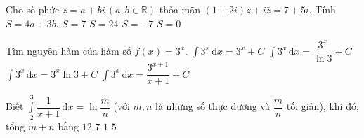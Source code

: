 \begin{ex}%
Cho số phức $z=a+bi\, (a,b\in \mathbb{R})$ thỏa mãn $(1+2i)z+i\bar{z}=7+5i$. Tính $S=4a+3b$.
\choice 
{$S=7$}
{$S=24$}
{$S=-7$}
{\True $S=0$}
\end{ex}
\begin{ex}%
Tìm nguyên hàm của hàm số $f(x)=3^x$.
\choice 
{$\displaystyle\int\limits 3^x \mathrm{\,d}x=3^x+C$}
{\True $\displaystyle\int\limits 3^x \mathrm{\,d}x=\dfrac{3^x}{\ln{3}}+C$}
{$\displaystyle\int\limits 3^x \mathrm{\,d}x=3^x\ln{3}+C$}
{$\displaystyle\int\limits 3^x \mathrm{\,d}x=\dfrac{3^{x+1}}{x+1}+C$}

\end{ex}
\begin{ex}%
Biết $\displaystyle\int\limits_2^3 \dfrac{1}{x+1}\mathrm{\,d}x=\ln{\dfrac{m}{n}}$ (với $m,n$ là những số thực dương và $\dfrac{m}{n}$ tối giản), khi đó, tổng $m+n$ bằng
\choice 
{$12$}
{\True $7$}
{$1$}
{$5$}
\end{ex}
